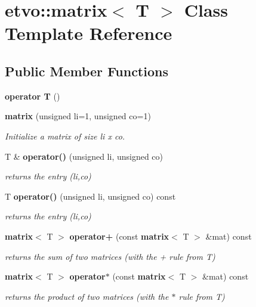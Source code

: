 \section{etvo\+:\+:matrix$<$ T $>$ Class Template Reference}
\label{classetvo_1_1matrix}
\subsection*{Public Member Functions}
\begin{DoxyCompactItemize}
\item 
\mbox{\label{classetvo_1_1matrix_a652c87888b7f22683326a920d20ce885}} 
{\bfseries operator T} ()
\item 
\mbox{\label{classetvo_1_1matrix_a2053769b66ded9534706ed384ad1aacf}} 
\textbf{ matrix} (unsigned li=1, unsigned co=1)
\begin{DoxyCompactList}\small\item\em Initialize a matrix of size li x co. \end{DoxyCompactList}\item 
\mbox{\label{classetvo_1_1matrix_a2906428c7c4695a34104d92ef6b873bf}} 
T \& \textbf{ operator()} (unsigned li, unsigned co)
\begin{DoxyCompactList}\small\item\em returns the entry (li,co) \end{DoxyCompactList}\item 
\mbox{\label{classetvo_1_1matrix_a50b4a1ad335afa30198321c7d870a8ce}} 
T \textbf{ operator()} (unsigned li, unsigned co) const
\begin{DoxyCompactList}\small\item\em returns the entry (li,co) \end{DoxyCompactList}\item 
\mbox{\label{classetvo_1_1matrix_a4d550808aec3aaf2faea4eb1e0d9975a}} 
\textbf{ matrix}$<$ T $>$ \textbf{ operator+} (const \textbf{ matrix}$<$ T $>$ \&mat) const
\begin{DoxyCompactList}\small\item\em returns the sum of two matrices (with the + rule from T) \end{DoxyCompactList}\item 
\mbox{\label{classetvo_1_1matrix_a7d267f72949f2cdd73b23520ced84782}} 
\textbf{ matrix}$<$ T $>$ \textbf{ operator$\ast$} (const \textbf{ matrix}$<$ T $>$ \&mat) const
\begin{DoxyCompactList}\small\item\em returns the product of two matrices (with the $\ast$ rule from T) \end{DoxyCompactList}\item 

\end{DoxyCompactItemize}
